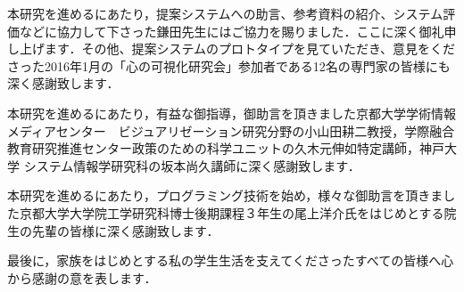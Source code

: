 本研究を進めるにあたり，提案システムへの助言、参考資料の紹介、システム評価などに協力して下さった鎌田先生にはご協力を賜りました．ここに深く御礼申し上げます．その他、提案システムのプロトタイプを見ていただき、意見をくださった2016年1月の「心の可視化研究会」参加者である12名の専門家の皆様にも深く感謝致します．

本研究を進めるにあたり，有益な御指導，御助言を頂きました京都大学学術情報メディアセンター　ビジュアリゼーション研究分野の小山田耕二教授，学際融合教育研究推進センター政策のための科学ユニットの久木元伸如特定講師，神戸大学 システム情報学研究科の坂本尚久講師に深く感謝致します．

本研究を進めるにあたり，プログラミング技術を始め，様々な御助言を頂きました京都大学大学院工学研究科博士後期課程３年生の尾上洋介氏をはじめとする院生の先輩の皆様に深く感謝致します．

最後に，家族をはじめとする私の学生生活を支えてくださったすべての皆様へ心から感謝の意を表します．